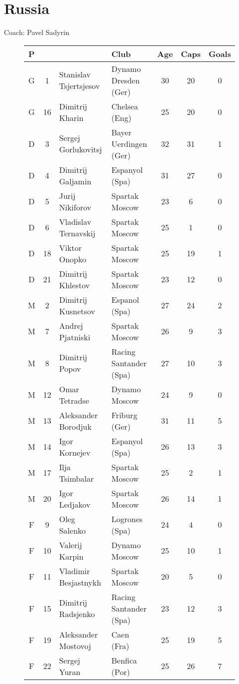 \chapter{Russia}
\newline
\newline
Coach: Pavel Sadyrin
\begin{figure}[H]
\begin{tabular}{c c l l c c c}
P & & & Club & Age & Caps & Goals \\ \hline
G & 1 & Stanislav Tsjertsjesov & Dynamo Dresden (Ger) & 30 & 20 & 0 \\
G &16 & Dimitrij Kharin &  Chelsea (Eng) & 25 & 20 & 0 \\ \hline
D & 3 & Sergej Gorlukovitsj & Bayer Uerdingen (Ger) & 32 & 31 & 1 \\
D & 4 & Dimitrij Galjamin & Espanyol (Spa) & 31 & 27 & 0 \\
D & 5 & Jurij Nikiforov & Spartak Moscow & 23 & 6 & 0 \\
D & 6 & Vladislav Ternavskij & Spartak Moscow & 25 & 1 & 0 \\
D &18 & Viktor Onopko & Spartak Moscow & 25 & 19 & 1 \\
D & 21 & Dimitrij Khlestov & Spartak Moscow & 23 & 12 & 0 \\ \hline
M & 2 & Dimitrij Kusnetsov & Espanol (Spa) & 27 & 24 & 2 \\
M & 7 & Andrej Pjatniski & Spartak Moscow & 26 & 9 & 3 \\
M & 8 & Dimitrij Popov & Racing Santander (Spa) & 27 & 10 & 3 \\
M &12 & Omar Tetradse & Dynamo Moscow & 24 & 9 & 0 \\
M &13 & Aleksander Borodjuk & Friburg (Ger) & 31 & 11 & 5 \\
M &14 & Igor Kornejev & Espanyol (Spa) & 26 & 13 & 3 \\
M &17 & Ilja Tsimbalar & Spartak Moscow & 25 & 2 & 1 \\
M & 20 & Igor Ledjakov & Spartak Moscow & 26 & 14 & 1 \\ \hline
F & 9 & Oleg Salenko & Logrones (Spa) & 24 & 4 & 0 \\
F & 10 & Valerij Karpin & Dynamo Moscow & 25 & 10 & 1 \\
F & 11 & Vladimir Besjastnykh & Spartak Moscow & 20 & 5 & 0 \\
F & 15 & Dimitrij Radsjenko & Racing Santander (Spa) & 23 & 12 & 3 \\
F & 19 & Aleksander Mostovoj & Caen (Fra) & 25 & 19 & 5 \\
F & 22 & Sergej Yuran & Benfica (Por) & 25 & 26 & 7 \\ \hline
\end{tabular}
\end{figure}
